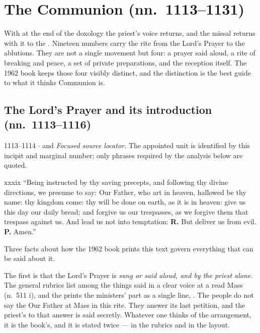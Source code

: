 \section{The Communion (nn.~1113--1131)}

With  at the end of the doxology the
priest's voice returns, and the missal returns with it to the . Nineteen numbers carry the rite from the Lord's Prayer to the
ablutions. They are not a single movement but four: a prayer said aloud, a rite
of breaking and peace, a set of private preparations, and the reception itself.
The 1962 book keeps those four visibly distinct, and the distinction is the
best guide to what it thinks Communion is.

\subsection*{The Lord's Prayer and its introduction (nn.~1113--1116)}

\begin{appointed}{1113--1114 $\cdot$  and }
\textit{Focused source locator.} The appointed unit is identified by this incipit and marginal number; only phrases required by the analysis below are quoted.
\end{appointed}

\begin{englishwitness}{xxxix}
``Being instructed by thy saving precepts, and following thy divine directions,
we presume to say: Our Father, who art in heaven, hallowed be thy name: thy
kingdom come: thy will be done on earth, as it is in heaven: give us this day
our daily bread; and forgive us our trespasses, as we forgive them that
trespass against us. And lead us not into temptation: \textbf{R.} But deliver
us from evil. \textbf{P.} Amen.''
\end{englishwitness}

Three facts about how the 1962 book prints this text govern everything that can
be said about it.

The first is that the Lord's Prayer is \emph{sung or said aloud, and by the
priest alone}. The general rubrics list  among the things said in a clear voice at a read Mass (n.~511 i),
and the  prints the ministers' part as a single line,
. The people do not say the Our Father at Mass
in this rite. They answer its last petition, and the priest's  to
that answer is said secretly. Whatever one thinks of the arrangement, it is the
book's, and it is stated twice --- in the rubrics and in the layout.

